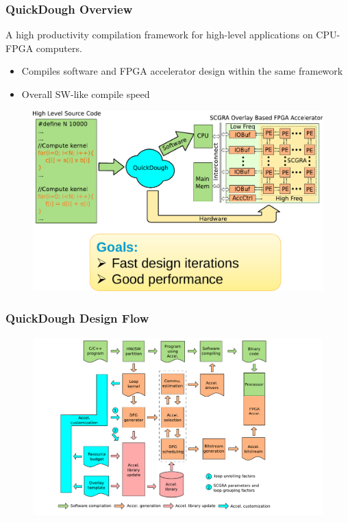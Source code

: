 \documentclass[accentcolor=tud1a,colorbacktitle,inverttitle,landscape,german,presentation,t]{tudbeamer}
\begin{document}
  \begin{frame}
  \frametitle{QuickDough Overview}
  \vspace{-0.6em}
  A high productivity compilation framework for high-level applications on CPU-FPGA computers.
  \begin{itemize}
    \item Compiles software and FPGA accelerator design within the same framework
    \item Overall SW-like compile speed
  \end{itemize}

  \begin{figure}
     \includegraphics[width=.75\linewidth]{qd-overview}
  \end{figure}
  \end{frame}

  \begin{frame}
  \frametitle{QuickDough Design Flow}
  \begin{figure}
     \includegraphics[width=.95\linewidth]{qd-flow1}
  \end{figure}
  \end{frame}
\end{document}
